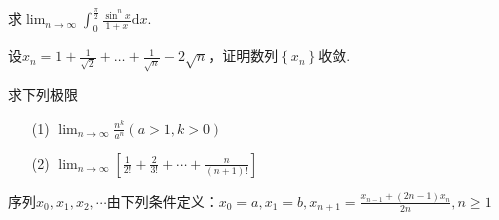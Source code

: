 \begin{xiti}
%			
%	
%	
%		
%	
%	
\item 求$\lim _ { n \rightarrow \infty } \int _ { 0 } ^ { \frac { \pi } { 2 } } \frac { \sin ^ { n } x } { 1 + x } \mathrm { d } x$.
\item 设$x _ { n } = 1 + \frac { 1 } { \sqrt { 2 } } + \dots + \frac { 1 } { \sqrt { n } } - 2 \sqrt { n }$，证明数列$\left\lbrace x_{n}\right\rbrace $收敛.
\item 求下列极限
\begin{enumerate}
	\item[(1)] $\lim _ { n \rightarrow \infty } \frac { n ^ { k } } { a ^ { n } } ( a > 1 , k > 0 )$
	\item[(2)] $\lim _ { n \rightarrow \infty } \left[ \frac { 1 } { 2 ! } + \frac { 2 } { 3 ! } + \cdots + \frac { n } { ( n + 1 ) ! } \right]$
\end{enumerate}
\item 序列$x _ { 0 } , x _ { 1 } , x _ { 2 } , \cdots$由下列条件定义：$x _ { 0 } = a , x _ { 1 } = b , x _ { n + 1 } = \frac { x _ { n - 1 } + ( 2 n - 1 ) x _ { n } } { 2 n } , n \geqslant 1$

\end{xiti}
